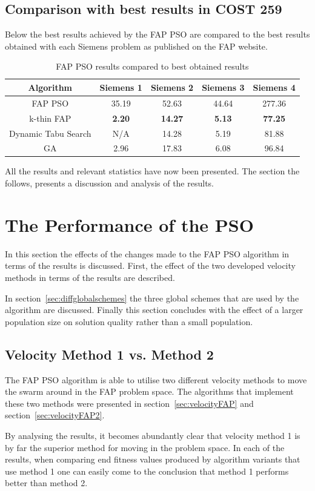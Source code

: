 \subsection{Comparison with best results in COST 259}
Below the best results achieved by the FAP PSO are compared to the best results obtained with each Siemens problem as published on the FAP website\cite{FAPWeb}.
\begin{table}[H]
\centering
\begin{tabular}{ccccc}
	\toprule
	Algorithm & Siemens 1 & Siemens 2 & Siemens 3 & Siemens 4 \\
    \midrule
	FAP PSO & 35.19 & 52.63 & 44.64 & 277.36 \\ 
	k-thin FAP & \textbf{2.20} & \textbf{14.27} & \textbf{5.13} & \textbf{77.25} \\ 
    Dynamic Tabu Search & \scriptsize{N/A} & 14.28 & 5.19 & 81.88 \\
	GA & 2.96 & 17.83 & 6.08 & 96.84 \\
    \bottomrule
	\end{tabular}
\caption{FAP PSO results compared to best obtained results}
\label{tab:allbest}
\end{table}

All the results and relevant statistics have now been presented. The section the follows, presents a discussion and analysis of the results.
\section{The Performance of the PSO}
In this section the effects of the changes made to the FAP PSO algorithm in terms of the results is discussed. First, the effect of the two developed velocity methods in terms of the results are described. 

In section~\ref{sec:diffglobalschemes} the three global schemes that are used by the algorithm are discussed. Finally this section concludes with the effect of a larger population size on solution quality rather than a small population.
\subsection{Velocity Method 1 vs. Method 2}
The FAP PSO algorithm is able to utilise two different velocity methods to move the swarm around in the FAP problem space. The algorithms that implement these two methods were presented in section~\ref{sec:velocityFAP} and section~\ref{sec:velocityFAP2}.

By analysing the results, it becomes abundantly clear that velocity method 1 is by far the superior method for moving in the problem space. In each of the results, when comparing end fitness values produced by algorithm variants that use method 1 one can easily come to the conclusion that method 1 performs better than method 2.

